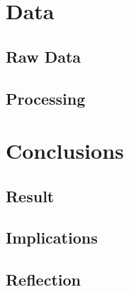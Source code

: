 \documentclass[a4paper,12pt]{article}
\begin{document}
\section{Data}
\subsection{Raw Data}
\subsection{Processing}

\section{Conclusions}
\subsection{Result}
\subsection{Implications}
\subsection{Reflection}
\end{document}
